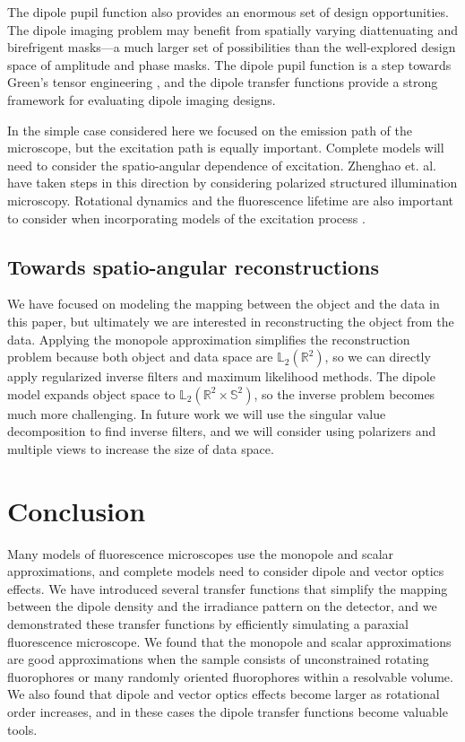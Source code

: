 \documentclass[]{osa-article}
\providecommand{\mbb}[1]{\mathbb{#1}}
\begin{document}
The dipole pupil function also provides an enormous set of design opportunities.
The dipole imaging problem may benefit from spatially varying diattenuating and
birefrigent masks---a much larger set of possibilities than the well-explored
design space of amplitude and phase masks. The dipole pupil function is a step
towards Green's tensor engineering \cite{agrawal2012}, and the dipole transfer
functions provide a strong framework for evaluating dipole imaging designs.

In the simple case considered here we focused on the emission path of the
microscope, but the excitation path is equally important. Complete models will
need to consider the spatio-angular dependence of excitation. Zhenghao et. al.
\cite{zhanghao2017} have taken steps in this direction by considering polarized
structured illumination microscopy. Rotational dynamics and the fluorescence
lifetime are also important to consider when incorporating models of the
excitation process \cite{lew2013, zhang2018, zhang2018-2}.

\subsection{Towards spatio-angular reconstructions}
We have focused on modeling the mapping between the object and the data in this
paper, but ultimately we are interested in reconstructing the object from the
data. Applying the monopole approximation simplifies the reconstruction problem
because both object and data space are $\mbb{L}_2(\mbb{R}^2)$, so we can
directly apply regularized inverse filters and maximum likelihood methods. The
dipole model expands object space to $\mbb{L}_2(\mbb{R}^2\times \mbb{S}^2)$, so
the inverse problem becomes much more challenging. In future work we will use
the singular value decomposition to find inverse filters, and we will consider
using polarizers and multiple views to increase the size of data space. 

\section{Conclusion}
Many models of fluorescence microscopes use the monopole and scalar
approximations, and complete models need to consider dipole and vector optics
effects. We have introduced several transfer functions that simplify the mapping
between the dipole density and the irradiance pattern on the detector, and we
demonstrated these transfer functions by efficiently simulating a paraxial
fluorescence microscope. We found that the monopole and scalar approximations
are good approximations when the sample consists of unconstrained rotating
fluorophores or many randomly oriented fluorophores within a resolvable volume.
We also found that dipole and vector optics effects become larger as rotational
order increases, and in these cases the dipole transfer functions become valuable
tools.
\end{document}
